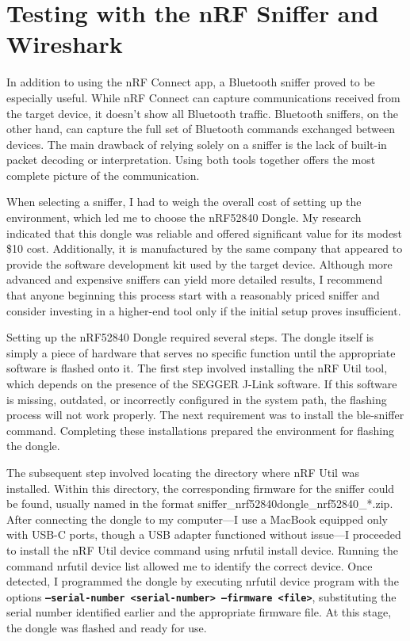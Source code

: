 \section{Testing with the nRF Sniffer and Wireshark}

In addition to using the nRF Connect app, a Bluetooth sniffer proved to be especially useful. While nRF Connect can capture communications received from the target device, it doesn’t show all Bluetooth traffic. Bluetooth sniffers, on the other hand, can capture the full set of Bluetooth commands exchanged between devices. The main drawback of relying solely on a sniffer is the lack of built-in packet decoding or interpretation. Using both tools together offers the most complete picture of the communication.

When selecting a sniffer, I had to weigh the overall cost of setting up the environment, which led me to choose the nRF52840 Dongle. My research indicated that this dongle was reliable and offered significant value for its modest \$10 cost. Additionally, it is manufactured by the same company that appeared to provide the software development kit used by the target device. Although more advanced and expensive sniffers can yield more detailed results, I recommend that anyone beginning this process start with a reasonably priced sniffer and consider investing in a higher-end tool only if the initial setup proves insufficient.

Setting up the nRF52840 Dongle required several steps. The dongle itself is simply a piece of hardware that serves no specific function until the appropriate software is flashed onto it. The first step involved installing the nRF Util tool, which depends on the presence of the SEGGER J-Link software. If this software is missing, outdated, or incorrectly configured in the system path, the flashing process will not work properly. The next requirement was to install the ble-sniffer command. Completing these installations prepared the environment for flashing the dongle.

The subsequent step involved locating the directory where nRF Util was installed. Within this directory, the corresponding firmware for the sniffer could be found, usually named in the format sniffer\_nrf52840dongle\_nrf52840\_*.zip. After connecting the dongle to my computer—I use a MacBook equipped only with USB-C ports, though a USB adapter functioned without issue—I proceeded to install the nRF Util device command using nrfutil install device. Running the command nrfutil device list allowed me to identify the correct device. Once detected, I programmed the dongle by executing nrfutil device program with the options \textbf{\texttt{--serial-number <serial-number> --firmware <file>}}, substituting the serial number identified earlier and the appropriate firmware file. At this stage, the dongle was flashed and ready for use.

